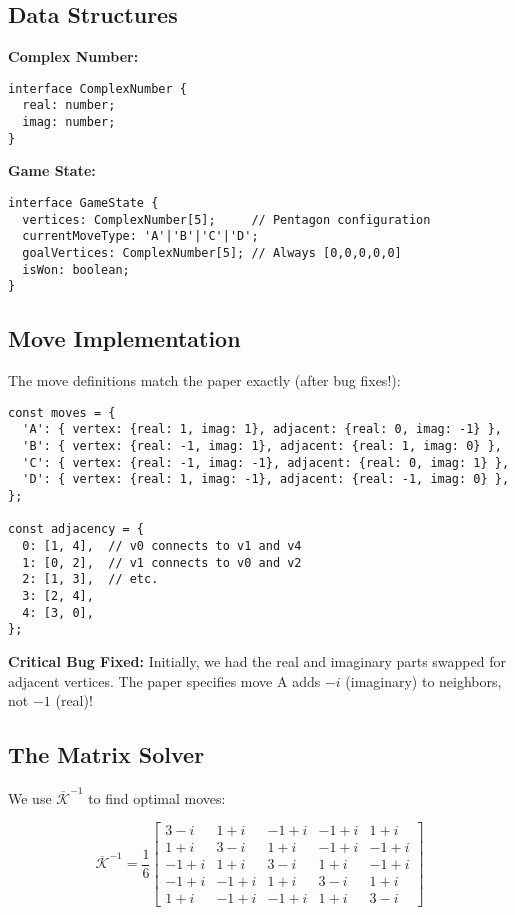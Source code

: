 \documentclass[11pt]{article}
\begin{document}
\subsection{Data Structures}

\textbf{Complex Number:}
\begin{verbatim}
interface ComplexNumber {
  real: number;
  imag: number;
}
\end{verbatim}

\textbf{Game State:}
\begin{verbatim}
interface GameState {
  vertices: ComplexNumber[5];     // Pentagon configuration
  currentMoveType: 'A'|'B'|'C'|'D';
  goalVertices: ComplexNumber[5]; // Always [0,0,0,0,0]
  isWon: boolean;
}
\end{verbatim}

\subsection{Move Implementation}

The move definitions match the paper exactly (after bug fixes!):

\begin{verbatim}
const moves = {
  'A': { vertex: {real: 1, imag: 1}, adjacent: {real: 0, imag: -1} },
  'B': { vertex: {real: -1, imag: 1}, adjacent: {real: 1, imag: 0} },
  'C': { vertex: {real: -1, imag: -1}, adjacent: {real: 0, imag: 1} },
  'D': { vertex: {real: 1, imag: -1}, adjacent: {real: -1, imag: 0} },
};

const adjacency = {
  0: [1, 4],  // v0 connects to v1 and v4
  1: [0, 2],  // v1 connects to v0 and v2
  2: [1, 3],  // etc.
  3: [2, 4],
  4: [3, 0],
};
\end{verbatim}

\textbf{Critical Bug Fixed:} Initially, we had the real and imaginary parts swapped for adjacent vertices. The paper specifies move A adds $-i$ (imaginary) to neighbors, not $-1$ (real)!

\subsection{The Matrix Solver}

We use $\overline{\mathcal{K}}^{-1}$ to find optimal moves:

\[
\overline{\mathcal{K}}^{-1} = \frac{1}{6}\begin{bmatrix}
    3 - i & 1 + i & -1 + i & -1 + i & 1 + i \\
    1 + i & 3 - i & 1 + i & -1 + i & -1 + i \\
    -1 + i & 1 + i & 3 - i & 1 + i & -1 + i \\
    -1 + i & -1 + i & 1 + i & 3 - i & 1 + i \\
    1 + i & -1 + i & -1 + i & 1 + i & 3 - i
\end{bmatrix}
\]
\end{document}
